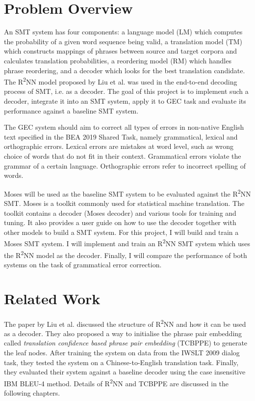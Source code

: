 \documentclass[12pt,a4paper,twoside,openright]{report}
\begin{document}
\section{Problem Overview}

An SMT system has four components: a language model (LM) which computes the probability of a given word sequence being valid, a translation model (TM) which constructs mappings of phrases between source and target corpora and calculates translation probabilities, a reordering model (RM) which handles phrase reordering, and a decoder which looks for the best translation candidate\cite{yuan2017phd}. The R\textsuperscript{2}NN model proposed by Liu et al. was used in the end-to-end decoding process of SMT, i.e. as a decoder. The goal of this project is to implement such a decoder, integrate it into an SMT system, apply it to GEC task and evaluate its performance against a baseline SMT system. 

The GEC system should aim to correct all types of errors in non-native English text specified in the BEA 2019 Shared Task\cite{bryant-etal-2019-bea}, namely grammatical, lexical and orthographic errors. Lexical errors are mistakes at word level, such as wrong choice of words that do not fit in their context. Grammatical errors violate the grammar of a certain language. Orthographic errors refer to incorrect spelling of words. 

Moses\cite{moses} will be used as the baseline SMT system to be evaluated against the R\textsuperscript{2}NN SMT. Moses is a toolkit commonly used for statistical machine translation. The toolkit contains a decoder (Moses decoder) and various tools for training and tuning. It also provides a user guide on how to use the decoder together with other models to build a SMT system. For this project, I will build and train a Moses SMT system. I will implement and train an R\textsuperscript{2}NN SMT system which uses the R\textsuperscript{2}NN model as the decoder. Finally, I will compare the performance of both systems on the task of grammatical error correction.

\section{Related Work}

The paper\cite{r2nn} by Liu et al. discussed the structure of R\textsuperscript{2}NN and how it can be used as a decoder.  They also proposed a way to initialise the phrase pair embedding called \textit{translation confidence based phrase pair embedding} (TCBPPE) to generate the leaf nodes. After training the system on data from the IWSLT 2009 dialog task, they tested the system on a Chinese-to-English translation task. Finally, they evaluated their system against a baseline decoder using the case insensitive IBM BLEU-4 method. Details of R\textsuperscript{2}NN and TCBPPE are discussed in the following chapters.
\end{document}
